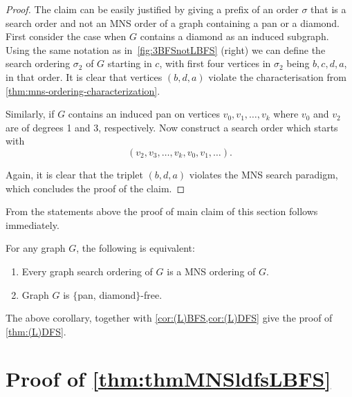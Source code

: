 \documentclass{svproc}
\begin{document}
\begin{proof}
The claim can be easily justified by giving a prefix of an order $\sigma$ that is a search order and not an MNS order of a graph containing a pan or a diamond.
First consider the case when $G$ contains a diamond as an induced subgraph. Using the same notation as in~\cref{fig:3BFSnotLBFS} (right) we can define the search ordering $\sigma_2$ of $G$ starting in $c$, with first four vertices in $\sigma_2$ being $b,c,d,a$, in that order. It is clear that vertices $(b,d,a)$ violate the characterisation from \cref{thm:mns-ordering-characterization}.

Similarly, if $G$ contains an induced pan on vertices $v_0,v_1,\dots,v_k$ where $v_0$ and $v_2$ are of degrees 1 and 3, respectively. Now construct a search order which starts with 
$$
(v_2,v_3,\dots,v_k,v_0,v_1,\dots).
$$

Again, it is clear that the triplet $(b,d,a)$ violates the MNS search paradigm, which concludes the proof of the claim.
\end{proof}

From the statements above the proof of main claim of this section follows immediately. 

\begin{corollary}\label{cor:g-MNS}
For any graph $G$, the following is equivalent: 
\begin{enumerate}[nosep, label = \roman*)]
    \item Every graph search ordering of $G$ is a MNS ordering of $G$.
    \item Graph $G$ is $\{$pan, diamond$\}$-free.
\end{enumerate}
\end{corollary}

The above corollary, together with \cref{cor:(L)BFS,cor:(L)DFS} give the proof of \cref{thm:(L)DFS}.

\section{Proof of \cref{thm:thmMNSldfsLBFS}}\label{sec:P4-C4}
\end{document}
